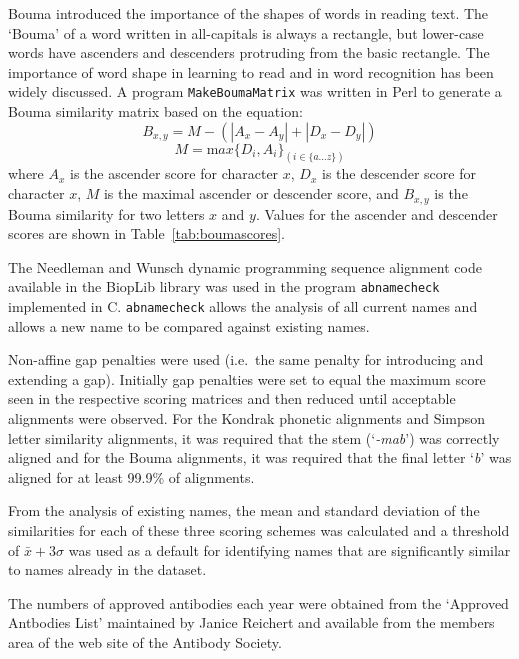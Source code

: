 \documentclass{article}
\newcommand{\eg}[1]{`\emph{#1}'}
\begin{document}
Bouma\cite{xxx} introduced the importance of the shapes of words in
reading text. The `Bouma' of a word written in all-capitals is always
a rectangle, but lower-case words have ascenders and descenders
protruding from the basic rectangle. The importance of word shape in
learning to read and in word recognition has been widely
discussed\cite{xxx}.  A program \verb|MakeBoumaMatrix| was written in
Perl to generate a Bouma similarity matrix based on the equation:
\begin{equation}
  B_{x,y} = M - (|A_x - A_y| + |D_x - D_y|)
\end{equation}
\begin{equation}
  M={\mathrm max}\{D_i, A_i\}_{(i\in \{a\ldots z\})}
\end{equation}
where $A_x$ is the ascender score for character $x$, $D_x$ is the
descender score for character $x$, $M$ is the maximal ascender or
descender score, and $B_{x,y}$ is the Bouma similarity for two letters
$x$ and $y$. Values for the ascender and descender scores are shown in
Table~\ref{tab:boumascores}.

The Needleman and Wunsch dynamic programming sequence alignment code
available in the BiopLib\cite{porter:bioplib} library was used in the
program \verb|abnamecheck| implemented in C. \verb|abnamecheck| allows
the analysis of all current names and allows a new name to be compared
against existing names.

Non-affine gap penalties were used (i.e.\ the same penalty for
introducing and extending a gap). Initially gap penalties were set to
equal the maximum score seen in the respective scoring matrices and
then reduced until acceptable alignments were observed. For the
Kondrak phonetic alignments and Simpson letter similarity alignments,
it was required that the stem (\eg{-mab}) was correctly aligned and
for the Bouma alignments, it was required that the final letter \eg{b}
was aligned for at least 99.9\% of alignments.

From the analysis of existing names, the mean and standard deviation
of the similarities for each of these three scoring schemes was
calculated and a threshold of $\bar{x} + 3\sigma$ was used as a
default for identifying names that are significantly similar to names
already in the dataset.

The numbers of approved antibodies each year were obtained from the
`Approved Antbodies List' maintained by Janice Reichert and available
from the members area of the web site of the Antibody Society.
\end{document}
